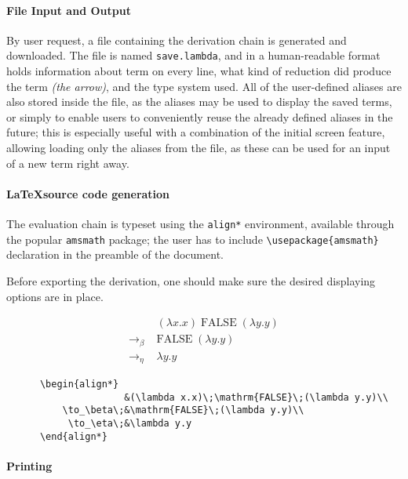 \documentclass[a4paper,10pt]{article}
\begin{document}
\paragraph{File Input and Output}
By user request, a file containing the derivation chain is generated and
downloaded. The file is named \texttt{save.lambda}, and in a human-readable
format holds information about term on every line, what kind of reduction
did produce the term \textit{(the arrow)}, and the type system used.
All of the user-defined aliases are also stored inside the file,
as the aliases may be used to display the saved terms, or simply to
enable users to conveniently reuse the already defined aliases in the future;
this is especially useful with a combination of the initial screen feature,
allowing loading only the aliases from the file, as these can be used for an input
of a new term right away.

\paragraph{\LaTeX\;source code generation}
The evaluation chain is typeset using the \texttt{align*} environment,
available through the popular \texttt{amsmath} package; the user
has to include \verb|\usepackage{amsmath}| declaration in the 
preamble of the document.

Before exporting the derivation, one should make sure the desired
displaying options are in place.

\begin{align*}
&(\lambda x.x)\;\mathrm{FALSE}\;(\lambda y.y)\\
\to_\beta\;&\mathrm{FALSE}\;(\lambda y.y)\\
\to_\eta\;&\lambda y.y
\end{align*}

\begin{verbatim}
      \begin{align*}
                     &(\lambda x.x)\;\mathrm{FALSE}\;(\lambda y.y)\\
          \to_\beta\;&\mathrm{FALSE}\;(\lambda y.y)\\
           \to_\eta\;&\lambda y.y
      \end{align*}
\end{verbatim}

\paragraph{Printing}
\end{document}
